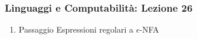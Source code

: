 




\begin{frame}[fragile]
	\frametitle{Linguaggi e Computabilità: Lezione 26}
\begin{enumerate}
\item
Passaggio Espressioni regolari a $\epsilon$-NFA
\end{enumerate}
\end{frame}



